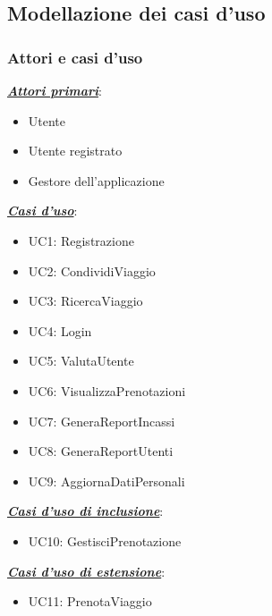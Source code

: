 \subsection{Modellazione dei casi d'uso}

\subsubsection{Attori e casi d'uso}

\begin{flushleft}

\textbf{\textit{\underline{Attori primari}}}:

\begin{itemize}
    \item {Utente}
    \item {Utente registrato}
    \item {Gestore dell'applicazione}
\end{itemize}

\textbf{\textit{\underline{Casi d'uso}}}:

\begin{itemize}
    \item {UC1: Registrazione}
    \item {UC2: CondividiViaggio}
    \item {UC3: RicercaViaggio}
    \item {UC4: Login}
    \item {UC5: ValutaUtente}
    \item {UC6: VisualizzaPrenotazioni}
    \item {UC7: GeneraReportIncassi}
    \item {UC8: GeneraReportUtenti}
    \item {UC9: AggiornaDatiPersonali}
\end{itemize}

\textbf{\textit{\underline{Casi d'uso di inclusione}}}:
\begin{itemize}
    \item {UC10: GestisciPrenotazione}
\end{itemize}


\textbf{\textit{\underline{Casi d'uso di estensione}}}:
\begin{itemize}
    \item {UC11: PrenotaViaggio}
\end{itemize}



\end{flushleft}
